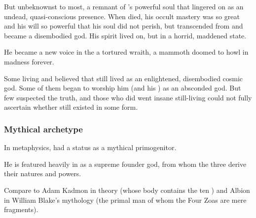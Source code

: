 But unbeknownst to most, a remnant of \Sethicus's powerful soul that lingered on as an undead, quasi-conscious presence.
When \Sethicus died, his occult mastery was so great and his will so powerful that his soul did not perish, but transcended from \Miith and became a disembodied god.
His spirit lived on, but in a horrid, maddened state. 

He became a new voice in the \dash a tortured wraith, a mammoth \daemon doomed to howl in madness forever. 


Some living \dragons and \ophidians believed that \Sethicus still lived as an enlightened, disembodied cosmic god.
Some of them began to worship him (and his ) as an absconded god.
But few suspected the truth, and those who did went insane still-living could not fully ascertain whether \Sethicus still existed in some form.





\subsubsection{Mythical archetype}
In \draconian metaphysics, \Sethicus had a status as a mythical primogenitor. 

He is featured heavily in \WanderersInDarknessEmph as a supreme founder god, from whom the three  derive their natures and powers. 

Compare to Adam Kadmon in \Cabbalist theory (whose body contains the ten \sephiroth) and Albion in William Blake's mythology (the primal man of whom the Four Zoas are mere fragments). 










